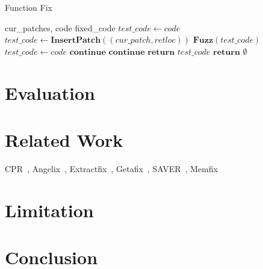 \documentclass[a4j,dvipdfmx]{article}
\begin{document}
 \begin{algorithm}
 \caption{Function Fix}
 \label{fix}
 \begin{algorithmic}[1]
 \renewcommand{\algorithmicrequire}{\textbf{Input:}}
 \renewcommand{\algorithmicensure}{\textbf{Output:}}
 \REQUIRE cur\_patches, code
 \ENSURE  fixed\_code
  \STATE $test\_code \gets code$
    \STATE $test\_code \gets \textbf{InsertPatch}((cur\_patch,retloc))$
    \STATE $\textbf{Fuzz}(test\_code)$
     \STATE $test\_code \gets code$
     \STATE $\textbf{continue}$
     \STATE $\textbf{continue}$
    \ELSE 
     \STATE $\textbf{return}$ $test\_code$
    \ENDIF
   \ENDFOR
  \ENDFOR
  \STATE $\textbf{return}$ $\emptyset$


 \end{algorithmic} 
 \end{algorithm}



\section{Evaluation}

\section{Related Work}
CPR~\cite{CPR}, Angelix~\cite{Angelix}, Extractfix~\cite{Extractfix}, Getafix~\cite{Getafix}, SAVER~\cite{SAVER}, Memfix~\cite{Memfix}

\section{Limitation}


\section{Conclusion}



\def\newblock{\hskip .11em plus .33em minus .07em}



\end{document}

